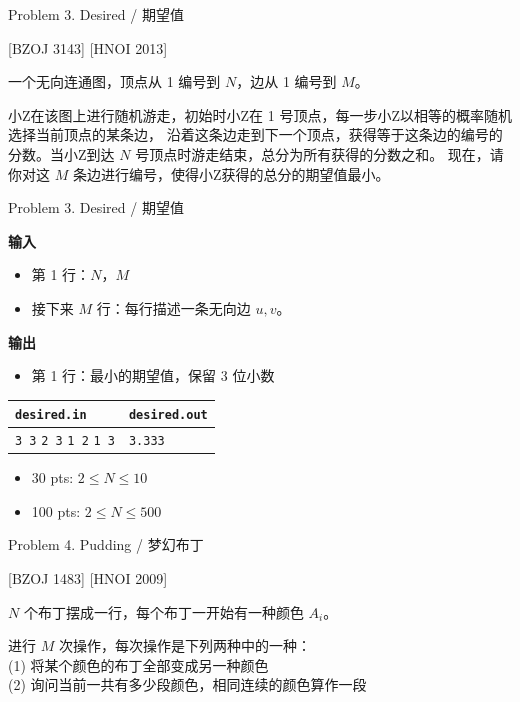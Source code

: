 \documentclass[UTF8]{beamer}
\begin{document}

\begin{frame}{Problem 3. Desired / 期望值}

[BZOJ 3143] [HNOI 2013]

一个无向连通图，顶点从 1 编号到 $N$，边从 1 编号到 $M$。

小Z在该图上进行随机游走，初始时小Z在 1 号顶点，每一步小Z以相等的概率随机选择当前顶点的某条边，
沿着这条边走到下一个顶点，获得等于这条边的编号的分数。当小Z到达 $N$ 号顶点时游走结束，总分为所有获得的分数之和。
现在，请你对这 $M$ 条边进行编号，使得小Z获得的总分的期望值最小。

\end{frame}

\begin{frame}{Problem 3. Desired / 期望值}

\textbf{输入}
\begin{itemize}
    \item 第 1 行：$N$，$M$
    \item 接下来 $M$ 行：每行描述一条无向边 $u, v$。
\end{itemize}
\textbf{输出}
\begin{itemize}
    \item 第 1 行：最小的期望值，保留 3 位小数
\end{itemize}

\begin{tabularx}{\textwidth}{|X|X|}
\hline
\texttt{\textbf{desired.in}} & \texttt{\textbf{desired.out}} \\ \hline
\texttt{3 3}\newline
\texttt{2 3}\newline
\texttt{1 2}\newline
\texttt{1 3}
&
\texttt{3.333}
\\ \hline
\end{tabularx}
\newline
\begin{itemize}
    \item 30 pts: $2 \leq N \leq 10$
    \item 100 pts: $2 \leq N \leq 500$
\end{itemize}

\end{frame}


\begin{frame}{Problem 4. Pudding / 梦幻布丁}

[BZOJ 1483] [HNOI 2009]

$N$ 个布丁摆成一行，每个布丁一开始有一种颜色 $A_i$。

进行 $M$ 次操作，每次操作是下列两种中的一种： \\
(1) 将某个颜色的布丁全部变成另一种颜色 \\
(2) 询问当前一共有多少段颜色，相同连续的颜色算作一段

\end{frame}
\end{document}
